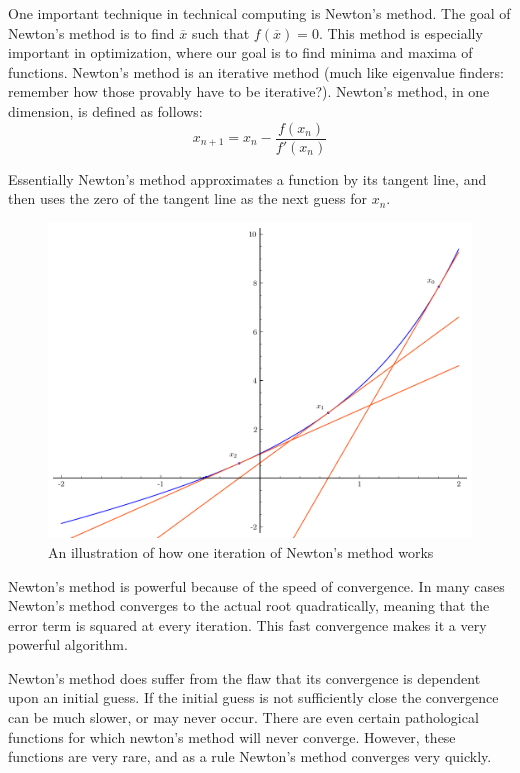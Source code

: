 \label{lab:NewtonsMethod}

One important technique in technical computing is Newton's method. The goal of Newton's method is to find $\overline{x}$ such that $f\left(\overline{x}\right) = 0$.
This method is especially important in optimization, where our goal is to find minima and maxima of functions.
Newton's method is an iterative method (much like eigenvalue finders: remember how those provably have to be iterative?).
Newton's method, in one dimension, is defined as follows:
\[
x_{n+1} = x_n - \frac{f(x_n)}{f'(x_n)}
\]

Essentially Newton's method approximates a function by its tangent line, and then uses the zero of the tangent line as the next guess for $x_n$.

\begin{figure}[h]
\centering
\includegraphics[width=\textwidth]{newton_iters}
\caption{An illustration of how one iteration of Newton's method works}
\end{figure}

Newton's method is powerful because of the speed of convergence.
In many cases Newton's method converges to the actual root quadratically, meaning that the error term is squared at every iteration.
This fast convergence makes it a very powerful algorithm.

Newton's method does suffer from the flaw that its convergence is dependent upon an initial guess.
If the initial guess is not sufficiently close the convergence can be much slower, or may never occur.
There are even certain pathological functions for which newton's method will never converge.
However, these functions are very rare, and as a rule Newton's method converges very quickly.



